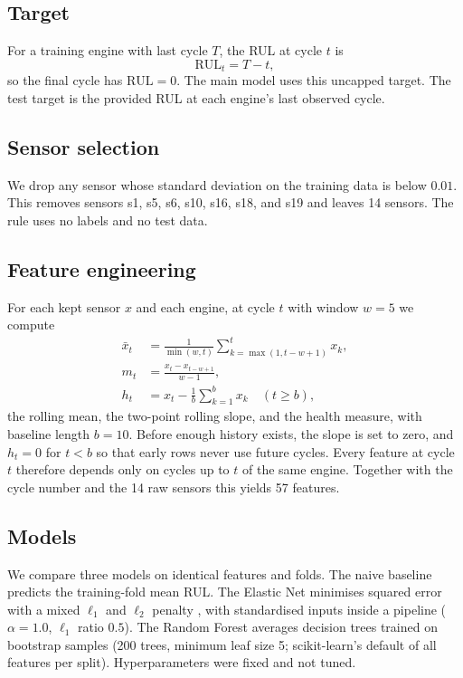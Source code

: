 \documentclass[conference]{IEEEtran}
\begin{document}
\subsection{Target}
For a training engine with last cycle $T$, the RUL at cycle $t$ is
\begin{equation}
\mathrm{RUL}_t = T - t,
\end{equation}
so the final cycle has $\mathrm{RUL}=0$. The main model uses this uncapped target. The test target is the provided RUL at each engine's last observed cycle.

\subsection{Sensor selection}
We drop any sensor whose standard deviation on the training data is below $0.01$. This removes sensors s1, s5, s6, s10, s16, s18, and s19 and leaves 14 sensors. The rule uses no labels and no test data.

\subsection{Feature engineering}
For each kept sensor $x$ and each engine, at cycle $t$ with window $w=5$ we compute
\begin{align}
\bar{x}_t &= \frac{1}{\min(w,t)}\sum_{k=\max(1,t-w+1)}^{t} x_k, \\
m_t &= \frac{x_t - x_{t-w+1}}{w-1}, \\
h_t &= x_t - \frac{1}{b}\sum_{k=1}^{b} x_k \quad (t \ge b),
\end{align}
the rolling mean, the two-point rolling slope, and the health measure, with baseline length $b=10$. Before enough history exists, the slope is set to zero, and $h_t=0$ for $t<b$ so that early rows never use future cycles. Every feature at cycle $t$ therefore depends only on cycles up to $t$ of the same engine. Together with the cycle number and the 14 raw sensors this yields 57 features.

\subsection{Models}
We compare three models on identical features and folds. The naive baseline predicts the training-fold mean RUL. The Elastic Net minimises squared error with a mixed $\ell_1$ and $\ell_2$ penalty \cite{zou2005en}, with standardised inputs inside a pipeline ($\alpha=1.0$, $\ell_1$ ratio $0.5$). The Random Forest averages decision trees trained on bootstrap samples \cite{breiman2001rf} (200 trees, minimum leaf size 5; scikit-learn's default of all features per split). Hyperparameters were fixed and not tuned.
\end{document}
